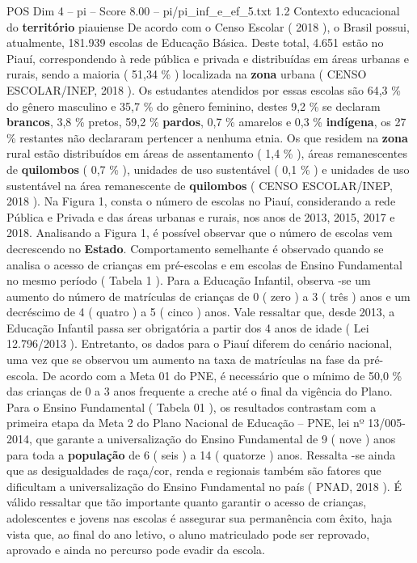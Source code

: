 \begin{textsample}{POS Dim 4 – pi – Score 8.00 – pi/pi\_inf\_e\_ef\_5.txt}  \label{ex:f4_pos_127}
1.2 Contexto educacional do \textbf{território} piauiense De acordo com o Censo Escolar ( 2018 ), o Brasil possui, atualmente, 181.939 escolas de Educação Básica.
Deste total, 4.651 estão no Piauí, correspondendo à rede pública e privada e distribuídas em áreas urbanas e rurais, sendo a maioria ( 51,34 \% ) localizada na \textbf{zona} urbana ( CENSO ESCOLAR/INEP, 2018 ).
Os estudantes atendidos por essas escolas são 64,3 \% do gênero masculino e 35,7 \% do gênero feminino, destes 9,2 \% se declaram \textbf{brancos}, 3,8 \% pretos, 59,2 \% \textbf{pardos}, 0,7 \% amarelos e 0,3 \% \textbf{indígena}, os 27 \% restantes não declararam pertencer a nenhuma etnia.
Os que residem na \textbf{zona} rural estão distribuídos em áreas de assentamento ( 1,4 \% ), áreas remanescentes de \textbf{quilombos} ( 0,7 \% ), unidades de uso sustentável ( 0,1 \% ) e unidades de uso sustentável na área remanescente de \textbf{quilombos} ( CENSO ESCOLAR/INEP, 2018 ).
Na Figura 1, consta o número de escolas no Piauí, considerando a rede Pública e Privada e das áreas urbanas e rurais, nos anos de 2013, 2015, 2017 e 2018.
Analisando a Figura 1, é possível observar que o número de escolas vem decrescendo no \textbf{Estado}.
Comportamento semelhante é observado quando se analisa o acesso de crianças em pré-escolas e em escolas de Ensino Fundamental no mesmo período ( Tabela 1 ).
Para a Educação Infantil, observa -se um aumento do número de matrículas de crianças de 0 ( zero ) a 3 ( três ) anos e um decréscimo de 4 ( quatro ) a 5 ( cinco ) anos.
Vale ressaltar que, desde 2013, a Educação Infantil passa ser obrigatória a partir dos 4 anos de idade ( Lei 12.796/2013 ).
Entretanto, os dados para o Piauí diferem do cenário nacional, uma vez que se observou um aumento na taxa de matrículas na fase da pré-escola.
De acordo com a Meta 01 do PNE, é necessário que o mínimo de 50,0 \% das crianças de 0 a 3 anos frequente a creche até o final da vigência do Plano.
Para o Ensino Fundamental ( Tabela 01 ), os resultados contrastam com a primeira etapa da Meta 2 do Plano Nacional de Educação – PNE, lei nº 13/005-2014, que garante a universalização do Ensino Fundamental de 9 ( nove ) anos para toda a \textbf{população} de 6 ( seis ) a 14 ( quatorze ) anos.
Ressalta -se ainda que as desigualdades de raça/cor, renda e regionais também são fatores que dificultam a universalização do Ensino Fundamental no país ( PNAD, 2018 ).
É válido ressaltar que tão importante quanto garantir o acesso de crianças, adolescentes e jovens nas escolas é assegurar sua permanência com êxito, haja vista que, ao final do ano letivo, o aluno matriculado pode ser reprovado, aprovado e ainda no percurso pode evadir da escola.

\end{textsample}
